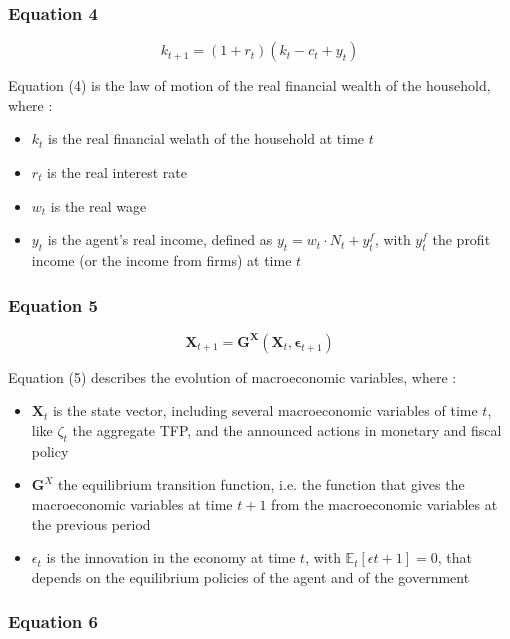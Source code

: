 \documentclass{article}
\begin{document}

\subsubsection*{Equation 4}
\begin{equation}\tag{4}
    k_{t+1}=(1+r_t)(k_{t}-c_{t}+y_{t})
\end{equation}

Equation (4) is the law of motion of the real financial wealth of the household, where : 
\begin{itemize}
    \item $k_t$ is the real financial welath of the household at time $t$
    \item $r_t$ is the real interest rate
    \item $w_t$ is the real wage
    \item $y_t$ is the agent's real income, defined as $y_t=w_t\cdot N_{t}+y_{t}^{f}$, with $y_{t}^{f}$ the profit income (or the income from firms) at time $t$
\end{itemize}

\subsubsection*{Equation 5}

\begin{equation}\tag{5}
    \bm{X}_{t+1}=\bm{G}^{\bm{X}}\left(\bm{X}_{t},\bm{\epsilon}_{t+1}\right)
\end{equation}

Equation (5) describes the evolution of macroeconomic variables, where : 
\begin{itemize}
    \item $\bm{X}_t$ is the state vector, including several macroeconomic variables of time $t$, like $\zeta_t$ the aggregate TFP, and the announced actions in monetary and fiscal policy
    \item $\bm{G}^X$ the equilibrium transition function, i.e. the function that gives the macroeconomic variables at time $t+1$ from the macroeconomic variables at the previous period
    \item $\epsilon_{t}$ is the innovation in the economy at time $t$, with $\mathbb{E}_{t}\left[\epsilon{t+1}\right]=0$, that depends on the equilibrium policies of the agent and of the government
\end{itemize}

\subsubsection*{Equation 6}
\end{document}
